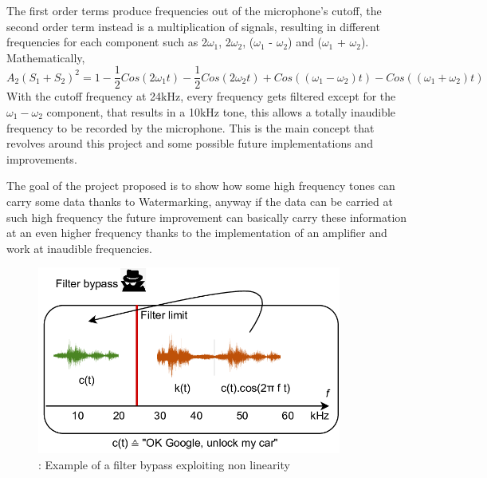 The first order terms produce frequencies out of the microphone's cutoff, the second order term  instead is a multiplication of signals, resulting in different frequencies for each component such as 2$\omega_1$, 2$\omega_2$, ($\omega_1$ - $\omega_2$) and ($\omega_1$ + $\omega_2$). Mathematically, 
\[ A_2(S_1 + S_2)^2 = 1 - \frac{1}{2}Cos(2\omega_1t) - \frac{1}{2}Cos(2\omega_2t) + Cos((\omega_1 - \omega_2)t) - Cos((\omega_1 + \omega_2)t)\]
With the cutoff frequency at 24kHz, every frequency gets filtered except for the $\omega_1 - \omega_2$ component, that results in a 10kHz tone, this allows a totally inaudible frequency to be recorded by the microphone.
This is the main concept that revolves around this project and some possible future implementations and improvements. \cite{backdoor}




The goal of the project proposed is to show how some high frequency tones can carry some data thanks to Watermarking, anyway if the data can be carried at such high frequency the future improvement can basically carry these information at an even higher frequency thanks to the implementation of an amplifier and work at inaudible frequencies.



 \begin{figure}[H]
    \centering
    \includegraphics[width=10cm]{LiveAudioWatermarking/images/Bypass.png}
    \caption{: Example of a filter bypass exploiting non linearity}
    \label{fig:market}
\end{figure}
